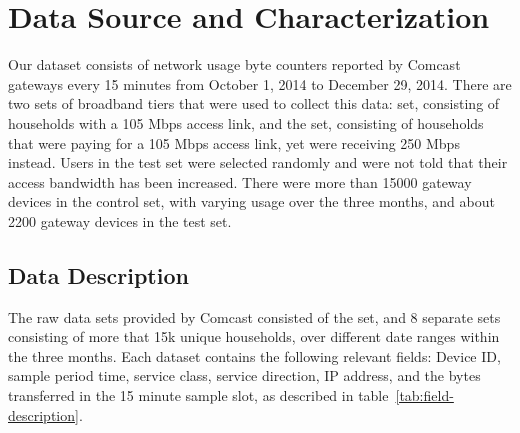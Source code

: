 \section{Data Source and Characterization}
\label{sec:data}

Our dataset consists of network usage byte counters reported by Comcast gateways 
every 15 minutes from October 1, 2014 to December 29, 2014. There are two sets 
of broadband tiers that were used to collect this data: \control set, consisting 
of households with a 105 Mbps access link, and the \test set, consisting of 
households that were paying for a 105 Mbps access link, yet were receiving 250 
Mbps instead. Users in the test set were selected randomly and were not told 
that their access bandwidth has been increased. There were more than 15000 
gateway devices in the control set, with varying usage over the three months, 
and about 2200 gateway devices in the test set.


\subsection{Data Description}
\label{subsec:data-description}

The raw data sets provided by Comcast consisted of the \test set, and 8 separate 
\control sets consisting of more that 15k unique households, over different 
date ranges within the three months. Each dataset contains the following 
relevant fields: Device ID, sample period time, service class, service 
direction, IP address, and the bytes transferred in the 15 minute sample slot, 
as described in table~\ref{tab:field-description}.

